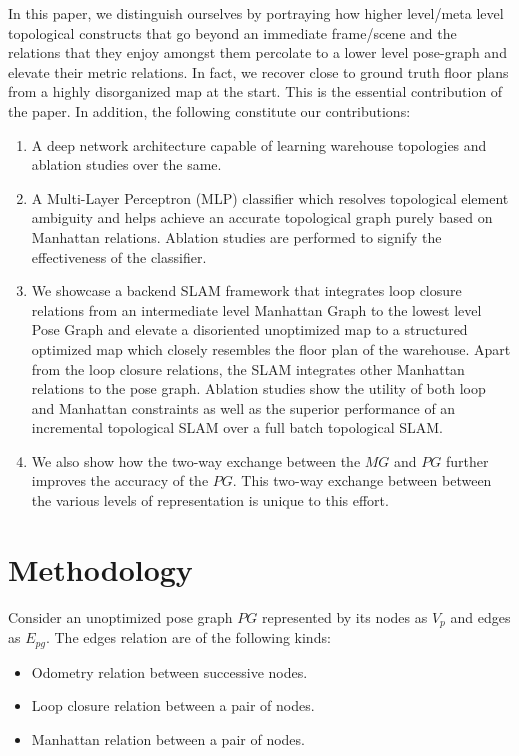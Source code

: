 \documentclass[letterpaper, 10 pt, conference]{ieeeconf}  %
\newcounter{todocounter}
\newcommand{\mk}[1]
{\stepcounter{todocounter}
	\todo[color=pink!40,author=MK, inline]{\thetodocounter: #1}
}
\begin{document}
	In this paper, we distinguish ourselves by portraying how higher level/meta level topological constructs that go beyond an immediate frame/scene and the relations that they enjoy amongst them percolate to a lower level pose-graph and elevate their metric relations. In fact, we recover close to ground truth floor plans from a highly disorganized map at the start. This is the essential contribution of the paper. In addition, the following constitute our contributions:
	\begin{enumerate}
		\item A deep network architecture capable of learning warehouse topologies and ablation studies over the same.
		\item A Multi-Layer Perceptron (MLP) classifier which resolves topological element ambiguity and helps achieve an accurate topological graph purely based on Manhattan relations. Ablation studies are performed to signify the effectiveness of the classifier. 
		\item We showcase a backend SLAM framework that integrates loop closure relations from an intermediate level Manhattan Graph to the lowest level Pose Graph and elevate a disoriented unoptimized map to a structured optimized map which closely resembles the floor plan of the warehouse. Apart from the loop closure relations, the SLAM integrates other Manhattan relations to the pose graph. Ablation studies show the utility of both loop and Manhattan constraints as well as the superior performance of an incremental topological SLAM over a full batch topological SLAM.
		\item We also show how the two-way exchange between the $MG$ and $PG$ further improves the accuracy of the $PG$. 
		This two-way exchange between between the various levels of representation is unique to this effort.  
	\end{enumerate}
	
	
	\section{Methodology}
	Consider an unoptimized pose graph $PG$ represented by its nodes as $V_{p}$ and edges as $E_{pg}$. The edges relation are of the following kinds:
	\begin{itemize}
		\item Odometry relation between successive nodes.
		\item Loop closure relation between a pair of nodes.
		\item Manhattan relation between a pair of nodes.
	\end{itemize} 
	
\end{document}
